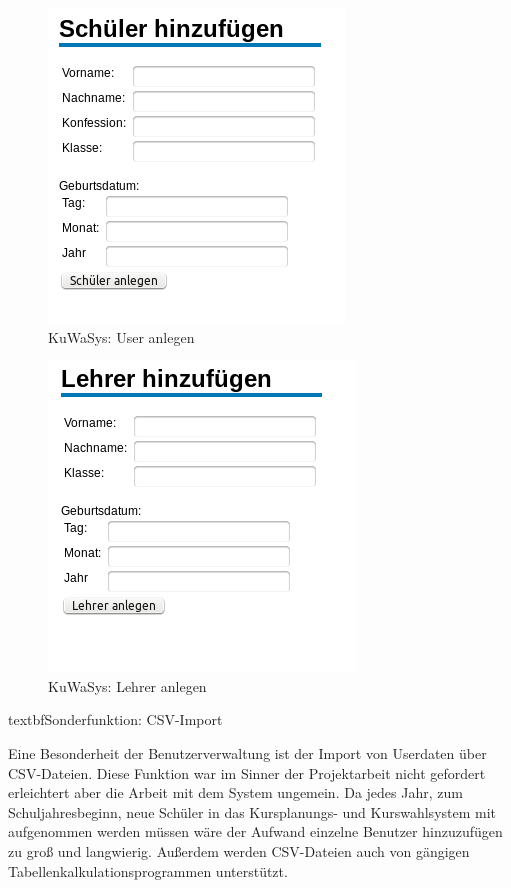 \begin{figure}[H]
 \begin{center}
   \includegraphics[scale=0.6]{img/UserAnlegen_KuWaSys.png}
 \end{center}
 \caption[\textbf{KuWaSys: User anlegen}]{KuWaSys: User anlegen}
 \label{fig:UserAnlegen_KuWaSys}
\end{figure}


\begin{figure}[H]
 \begin{center}
   \includegraphics[scale=0.6]{img/LehrerAnlegen_KuWaSys.png}
 \end{center}
 \caption[\textbf{KuWaSys: Lehrer anlegen}]{KuWaSys: Lehrer anlegen}
 \label{fig:LehrerAnlegen_KuWaSys}
\end{figure}

textbf{Sonderfunktion: CSV-Import}

Eine Besonderheit der Benutzerverwaltung ist der Import von Userdaten über \ac{CSV}-Dateien. Diese Funktion war im Sinner der Projektarbeit nicht gefordert erleichtert aber die Arbeit mit dem System ungemein. Da jedes Jahr, zum Schuljahresbeginn, neue Schüler in das Kursplanungs- und Kurswahlsystem mit aufgenommen werden müssen wäre der Aufwand einzelne Benutzer hinzuzufügen zu groß und langwierig. Außerdem werden CSV-Dateien auch von gängigen Tabellenkalkulationsprogrammen unterstützt.

